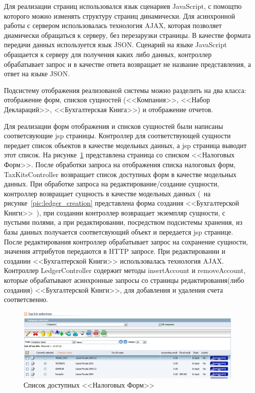 \documentclass[14pt,a4paper]{reportmod}
\begin{document}
Для реализации страниц использовался язык сценариев JavaScript, с помощтю которого можно изменять структуру страниц динамически. Для асинхронной работы с сервером использовалась технология AJAX, которая позволяет диамически обращаться к серверу, без перезарузки страницы. В качестве формата передачи данных используется язык JSON. Сценарий на языке JavaScript обращается к серверу для получения каких либо данных, контроллер обрабатывает запрос и в качестве ответа возвращает не название представления, а ответ на языке JSON.


Подсистему отображения реализованой системы можно разделить на два класса: отображение форм, списков сущностей (<<Компания>>, <<Набор Деклараций>>, <<Бухгалтерская Книга>>) и отображение отчетов.


Для реализации форм отображения и списков сущностей были написаны соответсвующие jsp страницы. Контроллер для соответствующей сущности передает список объектов в качестве модельных данных, а jsp страница выводит этот список. На рисунке~\ref{pic:taxkits_list} представлена страница со списком <<Налоговых Форм>>. После обработки запроса на отображения списка налоговых форм, TaxKitsController возвращает список доступных форм в качестве модельных данных. При обработке запроса на редактирование/создание сущности, контроллер возвращает сущность в качестве модельных данных (~на рисунке~\ref{pic:ledger_creation} представлена форма создания <<Бухгалтерской Книги>>~), при создании контроллер возвращает экземпляр сущности, с пустыми полями, а при редактировании, посредством подсистемы хранения, из базы данных получается соответсвующий объект и передается jsp странице. После редактирования контроллер обрабатывает запрос на сохранение сущности, значения аттрибутов передаются в HTTP запросе. При редактировании и создании <<Бухгалтерской Книги>> использовалась технология AJAX. Контроллер LedgerController содержит методы insertAccount и removeAccount, которые обрабатывают асинхронные запросы со страницы редактирования(либо создания) <<Бухгалтерской Книги>>, для добавления и удаления счета соответсвенно.


\begin{figure}
  \centering
  \includegraphics[scale=0.43]{pics/scr_taxkit_list}
  \caption{Список доступных <<Налоговых Форм>>}
  \label{pic:taxkits_list}
\end{figure}
\end{document}
